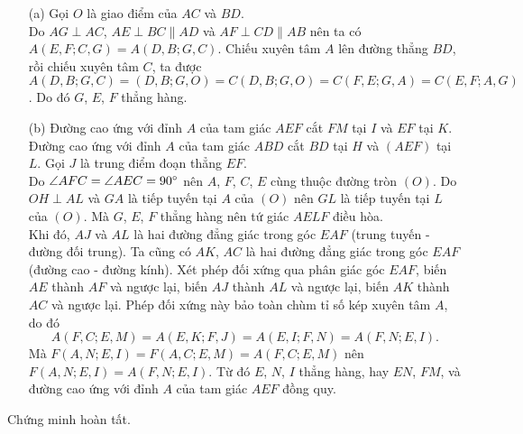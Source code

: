    \begin{solution}
        \hfill
        \begin{enumerate}
            \item[(a)] Gọi \(O\) là giao điểm của \(AC\) và \(BD\).\\
            Do \(AG \perp AC\), \(AE \perp BC \parallel AD\) và \(AF \perp CD \parallel AB\) nên ta có \(A(E,F;C,G) = A(D,B;G,C)\). Chiếu xuyên tâm \(A\) lên đường thẳng \(BD\), rồi chiếu xuyên tâm \(C\), ta được \(A(D,B;G,C) = (D,B;G,O) = C(D,B;G,O) = C(F,E;G,A) = C(E,F;A,G)\). Do đó \(G\), \(E\), \(F\) thẳng hàng.
            \item[(b)] Đường cao ứng với đỉnh \(A\) của tam giác \(AEF\) cắt \(FM\) tại \(I\) và \(EF\) tại \(K\). Đường cao ứng với đỉnh \(A\) của tam giác \(ABD\) cắt \(BD\) tại \(H\) và \((AEF)\) tại \(L\). Gọi \(J\) là trung điểm đoạn thẳng \(EF\).\\
            Do \(\angle AFC = \angle AEC = 90 \degree\) nên \(A\), \(F\), \(C\), \(E\) cùng thuộc đường tròn \((O)\). Do \(OH \perp AL\) và \(GA\) là tiếp tuyến tại \(A\) của \((O)\) nên \(GL\) là tiếp tuyến tại \(L\) của \((O)\). Mà \(G\), \(E\), \(F\) thẳng hàng nên tứ giác \(AELF\) điều hòa.\\
            Khi đó, \(AJ\) và \(AL\) là hai đường đẳng giác trong góc \(EAF\) (trung tuyến - đường đối trung). Ta cũng có \(AK\), \(AC\) là hai đường đẳng giác trong góc \(EAF\) (đường cao - đường kính). Xét phép đối xứng qua phân giác góc \(EAF\), biến \(AE\) thành \(AF\) và ngược lại, biến \(AJ\) thành \(AL\) và ngược lại, biến \(AK\) thành \(AC\) và ngược lại. Phép đối xứng này bảo toàn chùm tỉ số kép xuyên tâm \(A\), do đó
            \[A(F,C;E,M) = A(E,K;F,J) = A(E,I;F,N) = A(F,N;E,I).\]
            Mà \(F(A,N;E,I) = F(A,C;E,M) = A(F,C;E,M)\) nên \(F(A,N;E,I) = A(F,N;E,I)\). Từ đó \(E\), \(N\), \(I\) thẳng hàng, hay \(EN\), \(FM\), và đường cao ứng với đỉnh \(A\) của tam giác \(AEF\) đồng quy.
        \end{enumerate}
        Chứng minh hoàn tất.
    \end{solution}